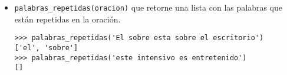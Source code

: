 \begin{itemize}
    \item \texttt{palabras\_repetidas(oracion)} que retorne una lista con las palabras que están repetidas en la oración.
    
    \begin{lstlisting}[style=consola]
>>> palabras_repetidas('El sobre esta sobre el escritorio')
['el', 'sobre']
>>> palabras_repetidas('este intensivo es entretenido')
[]
    \end{lstlisting}
\end{itemize}